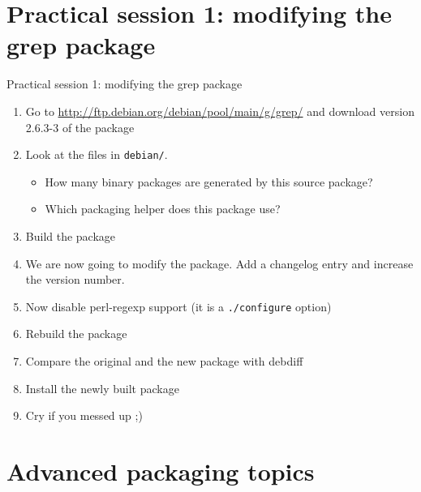 \documentclass[10pt,final]{beamer}
\begin{document}
\section{Practical session 1: modifying the grep package}
\begin{frame}{Practical session 1: modifying the grep package}
  \begin{enumerate}
  \item Go to \url{http://ftp.debian.org/debian/pool/main/g/grep/} and
    download version 2.6.3-3 of the package
  \item Look at the files in \texttt{debian/}.
    \begin{itemize}
    \item 		How many binary packages are generated by this source package?
    \item 		Which packaging helper does this package use?
    \end{itemize}
    \hbr
  \item Build the package
    \hbr
  \item We are now going to modify the package. Add a changelog entry and increase the version number.
    \hbr
  \item Now disable perl-regexp support (it is a \texttt{./configure} option)
    \hbr
  \item Rebuild the package
    \hbr
  \item Compare the original and the new package with debdiff
    \hbr
  \item Install the newly built package
    \hbr
  \item Cry if you messed up ;)
  \end{enumerate}
\end{frame}

\section{Advanced packaging topics}
\end{document}
